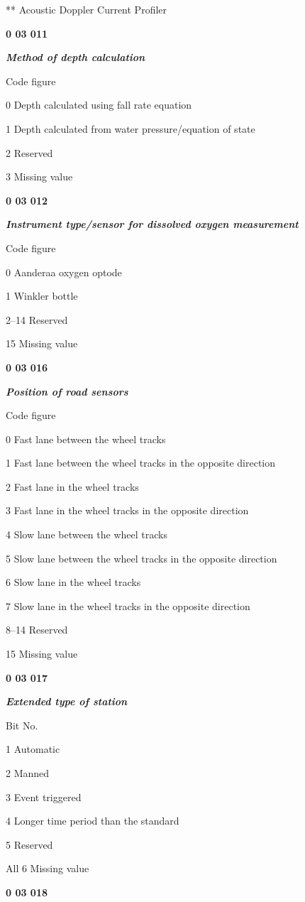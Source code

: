** Acoustic Doppler Current Profiler

\textbf{0 03 011}

\emph{\textbf{Method of depth calculation}}

Code figure

0 Depth calculated using fall rate equation

1 Depth calculated from water pressure/equation of state

2 Reserved

3 Missing value

\textbf{0 03 012}

\emph{\textbf{Instrument type/sensor for dissolved oxygen measurement}}

Code figure

0 Aanderaa oxygen optode

1 Winkler bottle

2--14 Reserved

15 Missing value

\textbf{0 03 016}

\emph{\textbf{Position of road sensors}}

Code figure

0 Fast lane between the wheel tracks

1 Fast lane between the wheel tracks in the opposite direction

2 Fast lane in the wheel tracks

3 Fast lane in the wheel tracks in the opposite direction

4 Slow lane between the wheel tracks

5 Slow lane between the wheel tracks in the opposite direction

6 Slow lane in the wheel tracks

7 Slow lane in the wheel tracks in the opposite direction

8--14 Reserved

15 Missing value

\textbf{0 03 017}

\emph{\textbf{Extended type of station}}

Bit No.

1 Automatic

2 Manned

3 Event triggered

4 Longer time period than the standard

5 Reserved

All 6 Missing value

\textbf{0 03 018}

